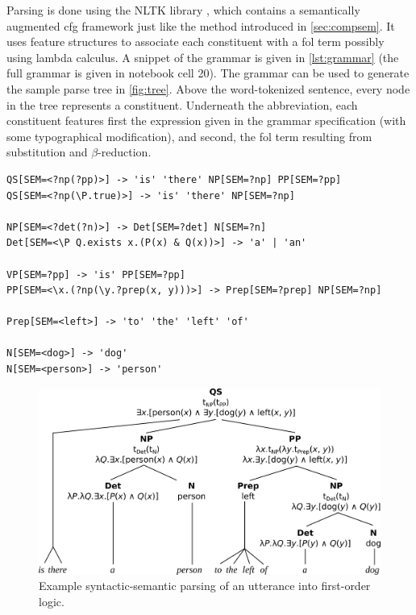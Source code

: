 Parsing is done using the NLTK library \citep{nltk}, which contains a semantically augmented \gls{cfg} framework just like the method introduced in \autoref{sec:compsem}.
It uses feature structures to associate each constituent with a \gls{fol} term possibly using lambda calculus.
A snippet of the grammar is given in \autoref{lst:grammar} (the full grammar is given in notebook cell 20).
The grammar can be used to generate the sample parse tree in \autoref{fig:tree}.
Above the word-tokenized sentence, every node in the tree represents a constituent.
Underneath the abbreviation, each constituent features first the expression given in the grammar specification (with some typographical modification), and second, the \gls{fol} term resulting from substitution and $\beta$-reduction.

\begin{lstlisting}[label={lst:grammar}, caption=A snippet of the FCFG grammar]
QS[SEM=<?np(?pp)>] -> 'is' 'there' NP[SEM=?np] PP[SEM=?pp]
QS[SEM=<?np(\P.true)>] -> 'is' 'there' NP[SEM=?np]

NP[SEM=<?det(?n)>] -> Det[SEM=?det] N[SEM=?n]
Det[SEM=<\P Q.exists x.(P(x) & Q(x))>] -> 'a' | 'an'

VP[SEM=?pp] -> 'is' PP[SEM=?pp]
PP[SEM=<\x.(?np(\y.?prep(x, y)))>] -> Prep[SEM=?prep] NP[SEM=?np]

Prep[SEM=<left>] -> 'to' 'the' 'left' 'of'

N[SEM=<dog>] -> 'dog'
N[SEM=<person>] -> 'person'
\end{lstlisting}

\begin{figure}[h]
\includegraphics[width=\textwidth]{tree}
\centering
\caption{Example syntactic-semantic parsing of an utterance into first-order logic.}
\label{fig:tree}
\end{figure}



